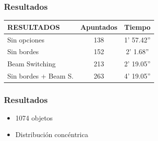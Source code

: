\begin{frame}
    \frametitle{Resultados}
    {\ttfamily
\begin{tabular}{||l||c|c||}
\hline
\hline
RESULTADOS & Apuntados & Tiempo \\
\hline
\hline
Sin opciones & 138 & 1' 57.42'' \\
\hline
Sin bordes & 152& 2' 1.68'' \\
\hline
Beam Switching & 213 & 2' 19.05'' \\
\hline
Sin bordes + Beam S. & 263 & 4' 19.05'' \\
\hline
\hline
\end{tabular}}
    \endblock{}
\end{frame}

\begin{frame}
    \frametitle{Resultados}
    \begin{itemize}
    \item 1074 objetos
    \item Distribución concéntrica
    \end{itemize}
    \endblock{}
		\begin{center}
		\end{center}
\end{frame}

